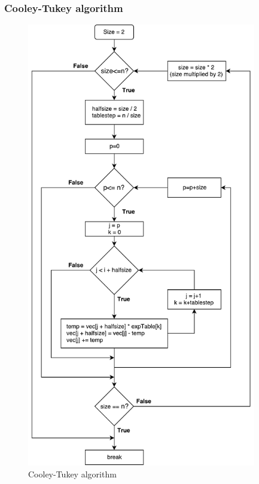 \subsubsection{Cooley-Tukey algorithm}
\begin{figure}[h]
	\centering
	\includegraphics[width=10cm]{./algorithms/fft/figures/Cooley_Tukey.pdf}
	\caption{Cooley-Tukey algorithm}\label{Cooley_Tukey}
\end{figure}

\newpage
